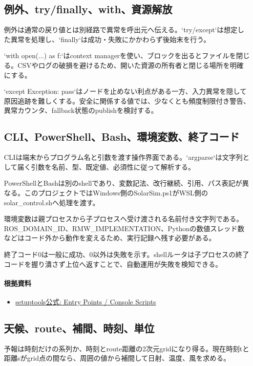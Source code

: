 \documentclass[a4paper,11pt]{article}
\begin{document}
\subsection{例外、try/finally、with、資源解放}
例外は通常の戻り値とは別経路で異常を呼出元へ伝える。`try/except`は想定した異常を処理し、`finally`は成功・失敗にかかわらず後始末を行う。


`with open(...) as f:`はcontext managerを使い、ブロックを出るとファイルを閉じる。CSVやログの破損を避けるため、開いた資源の所有者と閉じる場所を明確にする。


`except Exception: pass`はノードを止めない利点がある一方、入力異常を隠して原因追跡を難しくする。安全に関係する値では、少なくとも頻度制限付き警告、異常カウンタ、fallback状態のpublishを検討する。



\subsection{CLI、PowerShell、Bash、環境変数、終了コード}
CLIは端末からプログラム名と引数を渡す操作界面である。`argparse`は文字列として届く引数を名前、型、既定値、必須性に従って解析する。


PowerShellとBashは別のshellであり、変数記法、改行継続、引用、パス表記が異なる。このプロジェクトではWindows側のSolarSim.ps1がWSL側のsolar\_control.shへ処理を渡す。


環境変数は親プロセスから子プロセスへ受け渡される名前付き文字列である。ROS\_DOMAIN\_ID、RMW\_IMPLEMENTATION、Pythonの数値スレッド数などはコード外から動作を変えるため、実行記録へ残す必要がある。


終了コード0は一般に成功、0以外は失敗を示す。shellルータは子プロセスの終了コードを握り潰さず上位へ返すことで、自動運用が失敗を検知できる。

\paragraph{根拠資料}
\begin{itemize}[leftmargin=1.6em]
\item \href{https://setuptools.pypa.io/en/latest/userguide/entry_point.html}{setuptools公式: Entry Points / Console Scripts}
\end{itemize}

\subsection{天候、route、補間、時刻、単位}
予報は時刻だけの系列か、時刻とroute距離の2次元gridになり得る。現在時刻tと距離sがgrid点の間なら、周囲の値から補間して日射、温度、風を求める。
\end{document}
